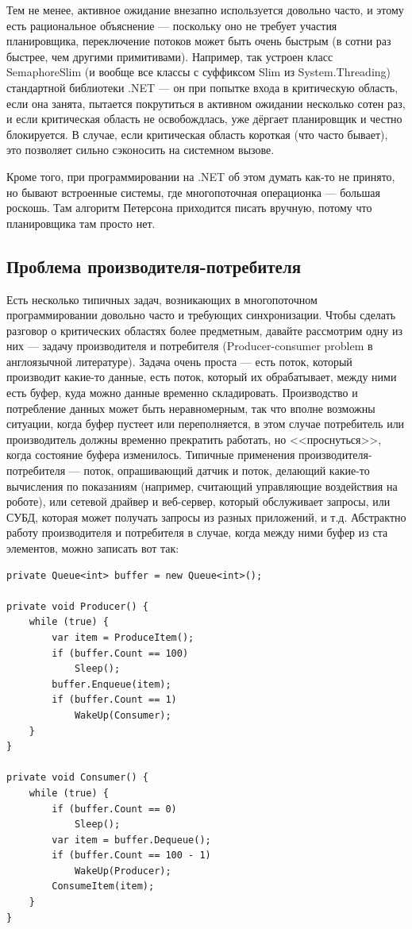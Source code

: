 \documentclass[a5paper]{article}
\begin{document}
Тем не менее, активное ожидание внезапно используется довольно часто, и этому есть рациональное объяснение --- поскольку оно не требует участия планировщика, переключение потоков может быть очень быстрым (в сотни раз быстрее, чем другими примитивами). Например, так устроен класс SemaphoreSlim (и вообще все классы с суффиксом Slim из System.Threading) стандартной библиотеки .NET --- он при попытке входа в критическую область, если она занята, пытается покрутиться в активном ожидании несколько сотен раз, и если критическая область не освобождлась, уже дёргает планировщик и честно блокируется. В случае, если критическая область короткая (что часто бывает), это позволяет сильно сэконосить на системном вызове.

Кроме того, при программировании на .NET об этом думать как-то не принято, но бывают встроенные системы, где многопоточная операционка --- большая роскошь. Там алгоритм Петерсона приходится писать вручную, потому что планировщика там просто нет.

\subsection{Проблема производителя-потребителя}

Есть несколько типичных задач, возникающих в многопоточном программировании довольно часто и требующих синхронизации. Чтобы сделать разговор о критических областях более предметным, давайте рассмотрим одну из них --- задачу производителя и потребителя (Producer-consumer problem в англоязычной литературе). Задача очень проста --- есть поток, который производит какие-то данные, есть поток, который их обрабатывает, между ними есть буфер, куда можно данные временно складировать. Производство и потребление данных может быть неравномерным, так что вполне возможны ситуации, когда буфер пустеет или переполняется, в этом случае потребитель или производитель должны временно прекратить работать, но <<проснуться>>, когда состояние буфера изменилось. Типичные применения производителя-потребителя --- поток, опрашивающий датчик и поток, делающий какие-то вычисления по показаниям (например, считающий управляющие воздействия на роботе), или сетевой драйвер и веб-сервер, который обслуживает запросы, или СУБД, которая может получать запросы из разных приложений, и т.д. Абстрактно работу производителя и потребителя в случае, когда между ними буфер из ста элементов, можно записать вот так:

\begin{verbatim}
private Queue<int> buffer = new Queue<int>();

private void Producer() {
    while (true) {
        var item = ProduceItem();
        if (buffer.Count == 100)
            Sleep();
        buffer.Enqueue(item);
        if (buffer.Count == 1)
            WakeUp(Consumer);
    }
}

private void Consumer() {
    while (true) {
        if (buffer.Count == 0)
            Sleep();
        var item = buffer.Dequeue();
        if (buffer.Count == 100 - 1)
            WakeUp(Producer);
        ConsumeItem(item);
    }
}
\end{verbatim}
\end{document}
